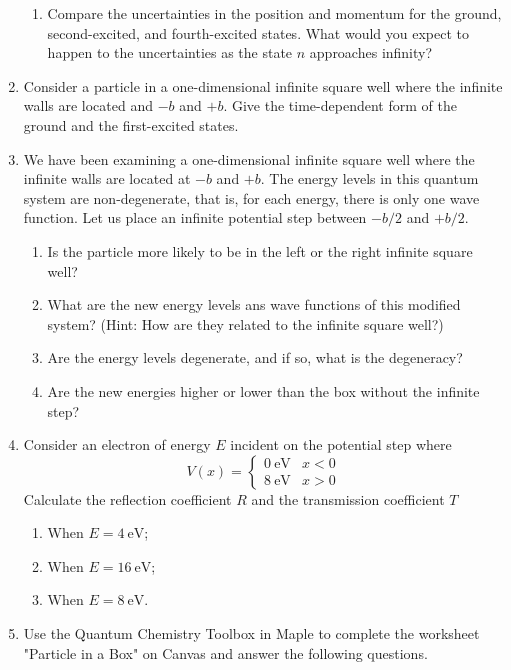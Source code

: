 \documentclass[../psets.tex]{subfiles}
\begin{document}
\begin{enumerate}
\begin{enumerate}
        \item Compare the uncertainties in the position and momentum for the ground, second-excited, and fourth-excited states. What would you expect to happen to the uncertainties as the state $n$ approaches infinity?
    \end{enumerate}
    \item Consider a particle in a one-dimensional infinite square well where the infinite walls are located and $-b$ and $+b$. Give the time-dependent form of the ground and the first-excited states.
    \item We have been examining a one-dimensional infinite square well where the infinite walls are located at $-b$ and $+b$. The energy levels in this quantum system are non-degenerate, that is, for each energy, there is only one wave function. Let us place an infinite potential step between $-b/2$ and $+b/2$.
    \begin{enumerate}
        \item Is the particle more likely to be in the left or the right infinite square well?
        \item What are the new energy levels ans wave functions of this modified system? (Hint: How are they related to the infinite square well?)
        \item Are the energy levels degenerate, and if so, what is the degeneracy?
        \item Are the new energies higher or lower than the box without the infinite step?
    \end{enumerate}
    \item Consider an electron of energy $E$ incident on the potential step where
    \begin{equation*}
        V(x) =
        \begin{cases}
            \SI{0}{\electronvolt} & x<0\\
            \SI{8}{\electronvolt} & x>0
        \end{cases}
    \end{equation*}
    Calculate the reflection coefficient $R$ and the transmission coefficient $T$
    \begin{enumerate}
        \item When $E=\SI{4}{\electronvolt}$;
        \item When $E=\SI{16}{\electronvolt}$;
        \item When $E=\SI{8}{\electronvolt}$.
    \end{enumerate}
    \item Use the Quantum Chemistry Toolbox in Maple to complete the worksheet "Particle in a Box" on Canvas and answer the following questions.

\end{enumerate}
\end{document}
